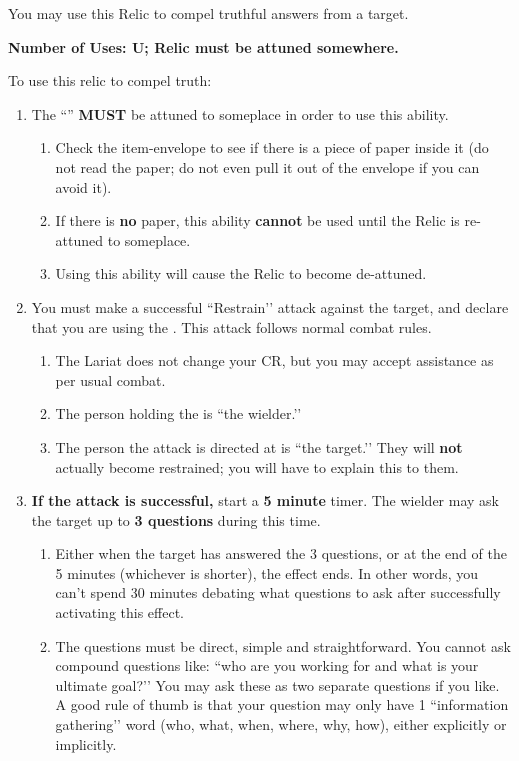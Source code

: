 \documentclass[green]{GL2020}
\begin{document}
\name{\gTruthRelic{}}

You may use this Relic to compel truthful answers from a target.

\textbf{Number of Uses: U; Relic must be attuned somewhere.}

To use this relic to compel truth:
\begin{enumerate}
  \item The ``\iLariat{}'' \textbf{MUST} be attuned to someplace in order to use this ability.
  \begin{enumerate}
    \item Check the item-envelope to see if there is a piece of paper inside it (do not read the paper; do not even pull it out of the envelope if you can avoid it).
    \item If there is \textbf{no} paper, this ability \textbf{cannot} be used until the Relic is re-attuned to someplace.
    \item Using this ability will cause the Relic to become de-attuned.
  \end{enumerate}
  \item You must make a successful ``Restrain’’ attack against the target, and declare that you are using the \iLariat{}. This attack follows normal combat rules.
   \begin{enumerate}
    \item The Lariat does not change your CR, but you may accept assistance as per usual combat.
    \item The person holding the \iLariat{} is ``the wielder.’’
    \item The person the attack is directed at is ``the target.’’ They will \textbf{not} actually become restrained; you will have to explain this to them.
  \end{enumerate}
  \item \textbf{If the attack is successful,} start a \textbf{5 minute} timer. The wielder may ask the target up to \textbf{3 questions} during this time.
  \begin{enumerate}
    \item Either when the target has answered the 3 questions, or at the end of the 5 minutes (whichever is shorter), the effect ends. In other words, you can’t spend 30 minutes debating what questions to ask after successfully activating this effect.
    \item The questions must be direct, simple and straightforward. You cannot ask compound questions like: ``who are you working for and what is your ultimate goal?’’ You may ask these as two separate questions if you like. A good rule of thumb is that your question may only have 1 ``information gathering’’ word (who, what, when, where, why, how), either explicitly or implicitly.

\end{enumerate}
\end{enumerate}
\end{document}
